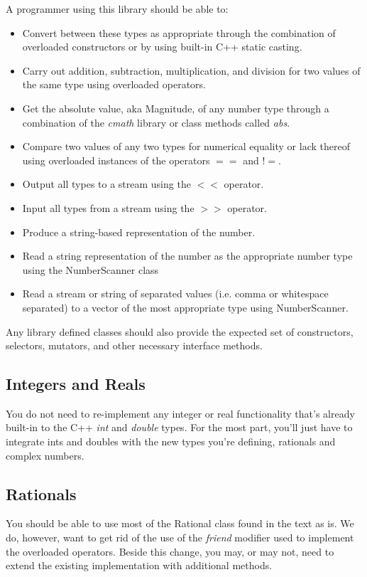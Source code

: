 \documentclass[10pt]{article}
\begin{document}
A programmer using this library should be able to:
\begin{itemize}
\item Convert between these types as appropriate through the combination of overloaded constructors or by using built-in C++ static casting.  
\item Carry out addition, subtraction, multiplication, and division for two values of the same type using overloaded operators. 
\item Get the absolute value, aka Magnitude, of any number type through a combination of the \textit{cmath} library or class methods called \textit{abs}. 
\item Compare two values of any two types for numerical equality or lack thereof using overloaded instances of the operators $==$ and $!=$.  
\item Output all types to a stream using the $<<$ operator.
\item Input all types from a stream using the $>>$ operator.
\item Produce a string-based representation of the number.
\item Read a string representation of the number as the appropriate number type using the NumberScanner class
\item Read a stream or string of separated values (i.e. comma or whitespace separated) to a vector of the most appropriate type using NumberScanner.   
\end{itemize}   
Any library defined classes should also provide the expected set of constructors, selectors, mutators, and other necessary interface methods. 

\subsection{Integers and Reals}

You do not need to re-implement any integer or real functionality that's already built-in to the C++ \textit{int} and \textit{double} types. For the most part, you'll just have to integrate ints and doubles with the new types you're defining, rationals and complex numbers.

\subsection{Rationals}

You should be able to use most of the Rational class found in the text as is.  We do, however, want to get rid of the use of the \textit{friend} modifier used to implement the overloaded operators. Beside this change, you may, or may not, need to extend the existing implementation with additional methods. 
\end{document}
